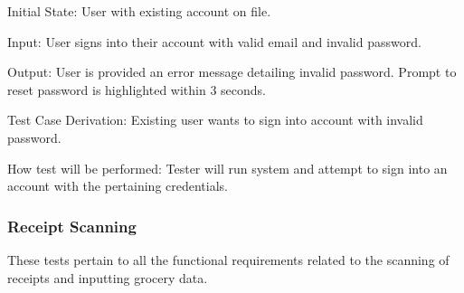 \documentclass[12pt, titlepage]{article}
\begin{document}
\begin{enumerate}
Initial State: User with existing account on file.
          
Input: User signs into their account with valid email and invalid password.
          
Output: User is provided an error message detailing invalid password. Prompt to reset password is highlighted within 3 seconds.

Test Case Derivation: Existing user wants to sign into account with invalid password.
          
How test will be performed: Tester will run system and attempt to sign into an account with the pertaining credentials.

\end{enumerate}

\subsubsection{Receipt Scanning}

These tests pertain to all the functional requirements related to the scanning of receipts and inputting grocery data.
\end{document}
